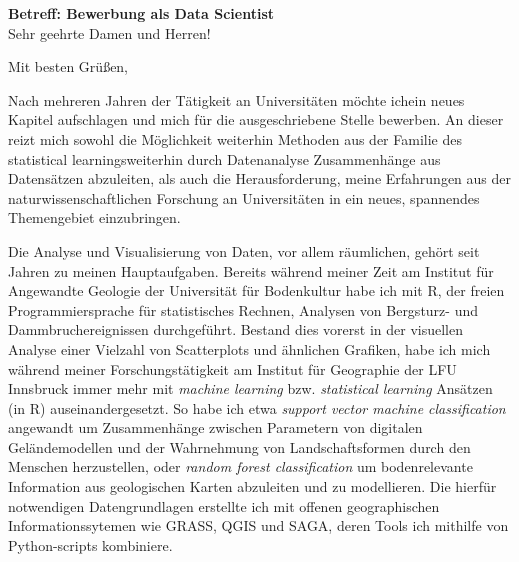 \documentclass[11pt,a4paper,sans]{moderncv}        %
\begin{document}
\renewcommand*{\bibliographyhead}[1]{}

\date{02. M\"arz 2018}
\opening{\textbf{Betreff: Bewerbung als Data Scientist} \\[0.5cm]     Sehr geehrte Damen und Herren!}
\closing{Mit besten Gr\"{u}{\ss}en,}

\makelettertitle
\justify
\vspace{-0.5cm} %

Nach mehreren Jahren der T\"atigkeit an Universit\"aten m\"ochte ichein neues Kapitel aufschlagen und mich f\"ur die ausgeschriebene Stelle bewerben. An dieser reizt mich sowohl die M\"oglichkeit weiterhin Methoden aus der Familie des statistical learningsweiterhin durch Datenanalyse Zusammenh\"ange aus Datens\"atzen abzuleiten, als auch die Herausforderung, meine Erfahrungen aus der naturwissenschaftlichen Forschung  an Universit\"aten in ein neues, spannendes Themengebiet einzubringen.

Die Analyse und Visualisierung von Daten, vor allem r\"aumlichen, geh\"ort seit Jahren zu meinen Hauptaufgaben. Bereits w\"ahrend meiner Zeit am Institut f\"ur Angewandte Geologie der Universit\"at f\"ur Bodenkultur habe ich mit R, der freien Programmiersprache f\"ur  statistisches Rechnen, Analysen von Bergsturz- und Dammbruchereignissen durchgef\"uhrt. Bestand dies vorerst in der visuellen Analyse einer Vielzahl von Scatterplots und \"ahnlichen Grafiken, habe ich mich w\"ahrend meiner Forschungst\"atigkeit am Institut f\"ur Geographie der LFU Innsbruck immer mehr mit  \emph{machine learning} bzw. \emph{statistical learning} Ans\"atzen (in R) auseinandergesetzt. So habe ich etwa \emph{support vector machine classification} angewandt um Zusammenh\"ange zwischen Parametern von digitalen Gel\"andemodellen und der Wahrnehmung von Landschaftsformen durch den Menschen herzustellen, oder \emph{random forest classification} um bodenrelevante Information aus geologischen Karten abzuleiten und zu modellieren. Die hierf\"ur notwendigen Datengrundlagen erstellte ich mit offenen geographischen Informationssytemen wie GRASS, QGIS und SAGA, deren Tools ich mithilfe von Python-scripts kombiniere. 
\end{document}
